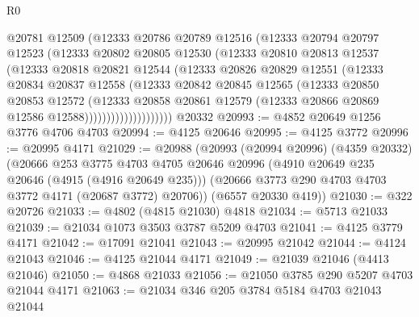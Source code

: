 \begin{lexlean}{R0}
\begin{coremodule}
                      @20781
                      @12509
                      (@12333
                        @20786
                        @20789
                        @12516
                        (@12333
                          @20794
                          @20797
                          @12523
                          (@12333
                            @20802
                            @20805
                            @12530
                            (@12333
                              @20810
                              @20813
                              @12537
                              (@12333
                                @20818
                                @20821
                                @12544
                                (@12333
                                  @20826
                                  @20829
                                  @12551
                                  (@12333
                                    @20834
                                    @20837
                                    @12558
                                    (@12333
                                      @20842
                                      @20845
                                      @12565
                                      (@12333
                                        @20850
                                        @20853
                                        @12572
                                        (@12333
                                          @20858
                                          @20861
                                          @12579
                                          (@12333 @20866 @20869 @12586 @12588))))))))))))))))))))
    @20332
@20993 := @4852 @20649 @1256 @3776 @4706 @4703
@20994 := @4125 @20646
@20995 := @4125 @3772
@20996 := @20995 @4171
@21029 := @20988
    (@20993
      (@20994 @20996)
      (@4359 @20332)
      (@20666
        @253
        @3775
        @4703
        @4705
        @20646
        @20996
        (@4910 @20649 @235 @20646 (@4915 (@4916 @20649 @235)))
        (@20666 @3773 @290 @4703 @4703 @3772 @4171 (@20687 @3772) @20706))
      (@6557 @20330 @419))
@21030 := @322 @20726
@21033 := @4802 (@4815 @21030) @4818
@21034 := @5713 @21033
@21039 := @21034 @1073 @3503 @3787 @5209 @4703
@21041 := @4125 @3779 @4171
@21042 := @17091 @21041
@21043 := @20995 @21042
@21044 := @4124 @21043
@21046 := @4125 @21044 @4171
@21049 := @21039 @21046 (@4413 @21046)
@21050 := @4868 @21033
@21056 := @21050 @3785 @290 @5207 @4703 @21044 @4171
@21063 := @21034 @346 @205 @3784 @5184 @4703 @21043 @21044

\end{coremodule}
\end{lexlean}
